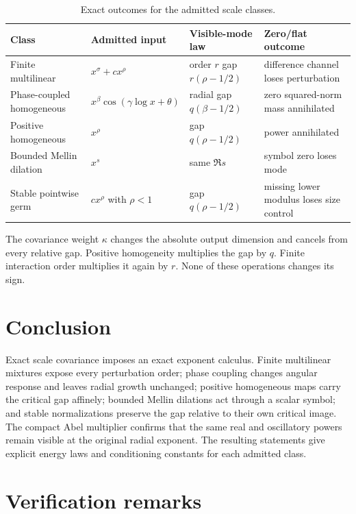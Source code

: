 \documentclass[11pt,a4paper]{amsart}
\theoremstyle{definition}
\begin{document}
\begin{table}[htbp]
\centering
\caption{Exact outcomes for the admitted scale classes.}
\label{tab:classes}
\small
\begin{tabular}{@{}L{0.25\textwidth}L{0.25\textwidth}L{0.20\textwidth}L{0.20\textwidth}@{}}
\toprule
Class & Admitted input & Visible-mode law & Zero/flat outcome\\
\midrule
Finite multilinear & $x^\sigma+cx^\rho$ & order $r$ gap $r(\rho-1/2)$ & difference channel loses perturbation\\
Phase-coupled homogeneous & $x^\beta\cos(\gamma\log x+\theta)$ & radial gap $q(\beta-1/2)$ & zero squared-norm mass annihilated\\
Positive homogeneous & $x^\rho$ & gap $q(\rho-1/2)$ & power annihilated\\
Bounded Mellin dilation & $x^s$ & same $\Re s$ & symbol zero loses mode\\
Stable pointwise germ & $cx^\rho$ with $\rho<1$ & gap $q(\rho-1/2)$ & missing lower modulus loses size control\\
\bottomrule
\end{tabular}
\end{table}

The covariance weight $\kappa$ changes the absolute output dimension and cancels from every relative gap.  Positive homogeneity multiplies the gap by $q$.  Finite interaction order multiplies it again by $r$.  None of these operations changes its sign.

\section{Conclusion}

Exact scale covariance imposes an exact exponent calculus.  Finite multilinear mixtures expose every perturbation order; phase coupling changes angular response and leaves radial growth unchanged; positive homogeneous maps carry the critical gap affinely; bounded Mellin dilations act through a scalar symbol; and stable normalizations preserve the gap relative to their own critical image.  The compact Abel multiplier confirms that the same real and oscillatory powers remain visible at the original radial exponent.  The resulting statements give explicit energy laws and conditioning constants for each admitted class.

\appendix
\section{Verification remarks}\label{app:audit}
\end{document}
